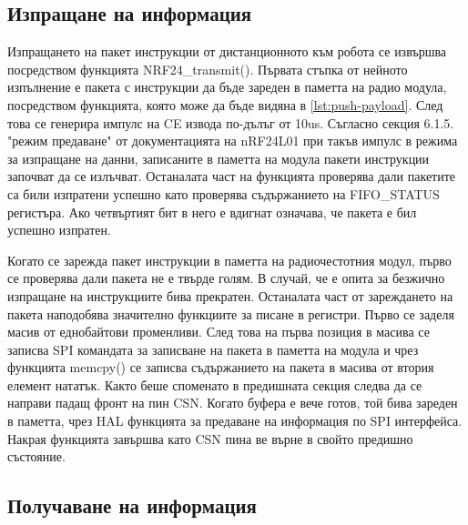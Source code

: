 \subsection{Изпращане на информация}
\label{ssec:transmit}

Изпращането на пакет инструкции от дистанционното към робота се извършва посредством функцията NRF24\_transmit(). Първата стъпка от нейното изпълнение е пакета с инструкции да бъде зареден в паметта на радио модула, посредством функцията, която може да бъде видяна в \autoref{lst:push-payload}. След това се генерира импулс на CE извода по-дълъг от 10us. Съгласно секция 6.1.5. "режим предаване" от документацията на nRF24L01 при такъв импулс в режима за изпращане на данни, записаните в паметта на модула пакети инструкции започват да се излъчват. Останалата част на функцията проверява дали пакетите са били изпратени успешно като проверява съдържанието на FIFO\_STATUS регистъра. Ако четвъртият бит в него е вдигнат означава, че пакета е бил успешно изпратен.



Когато се зарежда пакет инструкции в паметта на радиочестотния модул, първо се проверява дали пакета не е твърде голям. В случай, че е опита за безжично изпращане на инструкциите бива прекратен. Останалата част от зареждането на пакета наподобява значително функциите за писане в регистри. Първо се заделя масив от еднобайтови променливи. След това на първа позиция в масива се записва SPI командата за записване на пакета в паметта на модула и чрез функцията memcpy() се записва съдържанието на пакета в масива от втория елемент нататък. Както беше споменато в предишната секция следва да се направи падащ фронт на пин CSN. Когато буфера е вече готов, той бива зареден в паметта, чрез HAL функцията за предаване на информация по SPI интерфейса. Накрая функцията завършва като CSN пина ве върне в свойто предишно състояние.




\subsection{Получаване на информация}
\label{ssec:receive}


